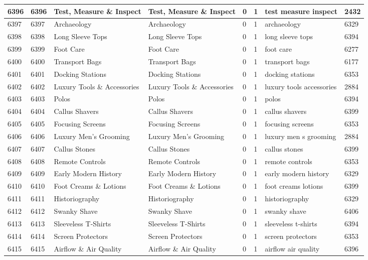 \begin{longtable}{|l|l|l|l|l|l|l|l|}
6396 & 6396 & Test, Measure \& Inspect & Test, Measure \& Inspect & 0 & 1 & test measure inspect & 2432 \\ \hline 
6397 & 6397 & Archaeology & Archaeology & 0 & 1 & archaeology & 6329 \\ \hline 
6398 & 6398 & Long Sleeve Tops & Long Sleeve Tops & 0 & 1 & long sleeve tops & 6394 \\ \hline 
6399 & 6399 & Foot Care & Foot Care & 0 & 1 & foot care & 6277 \\ \hline 
6400 & 6400 & Transport Bags & Transport Bags & 0 & 1 & transport bags & 6177 \\ \hline 
6401 & 6401 & Docking Stations & Docking Stations & 0 & 1 & docking stations & 6353 \\ \hline 
6402 & 6402 & Luxury Tools \& Accessories & Luxury Tools \& Accessories & 0 & 1 & luxury tools accessories & 2884 \\ \hline 
6403 & 6403 & Polos & Polos & 0 & 1 & polos & 6394 \\ \hline 
6404 & 6404 & Callus Shavers & Callus Shavers & 0 & 1 & callus shavers & 6399 \\ \hline 
6405 & 6405 & Focusing Screens & Focusing Screens & 0 & 1 & focusing screens & 6353 \\ \hline 
6406 & 6406 & Luxury Men's Grooming & Luxury Men's Grooming & 0 & 1 & luxury men s grooming & 2884 \\ \hline 
6407 & 6407 & Callus Stones & Callus Stones & 0 & 1 & callus stones & 6399 \\ \hline 
6408 & 6408 & Remote Controls & Remote Controls & 0 & 1 & remote controls & 6353 \\ \hline 
6409 & 6409 & Early Modern History & Early Modern History & 0 & 1 & early modern history & 6329 \\ \hline 
6410 & 6410 & Foot Creams \& Lotions & Foot Creams \& Lotions & 0 & 1 & foot creams lotions & 6399 \\ \hline 
6411 & 6411 & Historiography & Historiography & 0 & 1 & historiography & 6329 \\ \hline 
6412 & 6412 & Swanky Shave & Swanky Shave & 0 & 1 & swanky shave & 6406 \\ \hline 
6413 & 6413 & Sleeveless T-Shirts & Sleeveless T-Shirts & 0 & 1 & sleeveless t-shirts & 6394 \\ \hline 
6414 & 6414 & Screen Protectors & Screen Protectors & 0 & 1 & screen protectors & 6353 \\ \hline 
6415 & 6415 & Airflow \& Air Quality & Airflow \& Air Quality & 0 & 1 & airflow air quality & 6396 \\ \hline 

\end{longtable}
